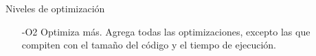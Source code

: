 \documentclass[aspectratio=169]{beamer}
\begin{document}
\begin{frame}[fragile,t]{Niveles de optimización}
\begin{itemize}
\item[-O2] Optimiza más. Agrega todas las optimizaciones, excepto las que compiten con el tamaño del código y el tiempo de ejecución.

\end{itemize}
\end{frame}
\end{document}
